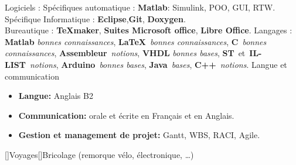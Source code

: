 \documentclass[11pt,a4paper,sans]{moderncv}        %
\newcommand{\myitem}{\textbullet}
\begin{document}
\begin{samepage}
%		
%
\tripleitemiseavecTitre%
{Logiciels :}%
{{%
	Spécifiques automatique : {\small \textbf{Matlab}: Simulink, POO, GUI, RTW}.\\
	Spécifique Informatique : {\small \textbf{Eclipse},\textbf{Git}, \textbf{Doxygen}}.\\
	Bureautique : {\small \textbf{\TeX maker}, \textbf{Suites Microsoft office}, \textbf{Libre Office}.}%
}}%
{Langages :}%
{%
	\textbf{Matlab} \textit{bonnes connaissances}, \textbf{\LaTeX}~\textit{bonnes connaissances}, \textbf{C}~\textit{bonnes connaissances}, 	\textbf{Assembleur}~\textit{notions}, \textbf{VHDL} \textit{bonnes bases}, \textbf{ST}~et~\textbf{IL-LIST}~\textit{notions}, \textbf{Arduino}~\textit{bonnes bases}, \textbf{Java}~\textit{bases}, \textbf{C++}~\textit{notions}.%
}%
{Langue et communication}%
{{%
	\begin{itemize}[label=\myitem]%
	\item \textbf{Langue: } {\small Anglais B2}%
	\item \textbf{Communication: } {\small orale et écrite en Français et en Anglais.} %
	\item \textbf{Gestion et management de projet: } {\small Gantt, WBS, RACI, Agile.}%
	\end{itemize}%
}}
[\bcfleur]{Voyages}[\bcvelo]{Bricolage (remorque vélo, électronique, …)}%
\end{samepage}%
\end{document}
